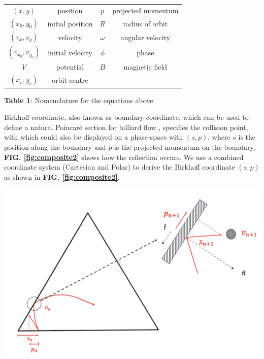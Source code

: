\documentclass[a0,portrait]{a0poster}
\begin{document}
\begin{multicols}{3}
\begin{tabular}{cccc}
\toprule
$(x,y)$ & position & $p$ & projected momentum  \\
$(x_0,y_0)$ & initial position & $R$ & radius of orbit \\
$(v_x,v_y)$ & velocity & $\omega$ & angular velocity \\
$(v_{x_0},v_{y_0})$ & initial velocity & $\phi$ &phase \\
$V$ & potential & $B$ & magnetic field \\
$(x_c,y_c)$ & orbit centre &&\\
\bottomrule
\end{tabular}
\begin{center}
    \textbf{Table 1}: Nomenclature for the equations above
\end{center}


Birkhoff coordinate, also known as boundary coordinate, which can be used to define a natural Poincaré section for billiard flow \cite{cvitanovic2020chaos}, specifies the collision point, with which could also be displayed on a phase-space with $(s,p)$, where $s$ is the position along the boundary and $p$ is the projected momentum on the boundary. \textbf{FIG. \ref{fig:composite2}} shows how the reflection occurs. We use a combined coordinate system (Cartesian and Polar) to derive the Birkhoff coordinate $(s,p)$ as shown in \textbf{FIG. \ref{fig:composite2}}.

\begin{center}\vspace{1cm}
    \includegraphics[width=0.5\linewidth]{projection2.png}
    \label{fig:projection2}
\end{center}%


\end{multicols}
\end{document}
